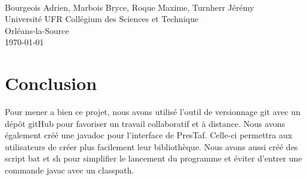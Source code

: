 \documentclass[12pt]{article}%
\begin{document}
\pagestyle{empty}

\begin{titlepage}
\begin{center}
\\
\vspace{0.5cm}
\vspace{2cm}
{\Large Bourgeois Adrien, Marbois Bryce, Roque Maxime, Turnherr Jérémy
\\Université UFR Collégium des Sciences et Technique
\\Orléans-la-Source}\\
\vfill
{\large\today}
\end{center}
\end{titlepage}

\clearpage

\tableofcontents

\cleardoublepage

\pagestyle{fancy}

























\section{Conclusion}

Pour mener a bien ce projet, nous avons utilisé l'outil de versionnage git avec un dépôt gitHub pour favoriser un travail collaboratif et à distance. Nous avons également créé une javadoc pour l'interface de PresTaf. Celle-ci permettra aux utilisateurs de créer plus facilement leur bibliothèque. Nous avons aussi créé des script bat et sh pour simplifier le lancement du programme et éviter d'entrer une commande javac avec un classpath.
	
\end{document}
